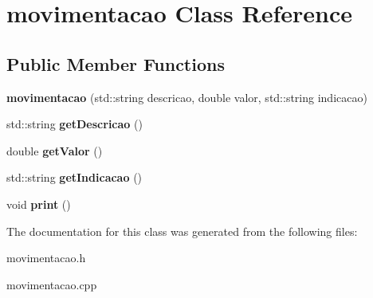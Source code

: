 \hypertarget{classmovimentacao}{}\section{movimentacao Class Reference}
\label{classmovimentacao}
\subsection*{Public Member Functions}
\begin{DoxyCompactItemize}
\item 
\mbox{\label{classmovimentacao_a2040c4f41fcf8679566dfa320883c33d}} 
{\bfseries movimentacao} (std\+::string descricao, double valor, std\+::string indicacao)
\item 
\mbox{\label{classmovimentacao_ad61189a54a8eee2bcfdfd615e43ff1b5}} 
std\+::string {\bfseries get\+Descricao} ()
\item 
\mbox{\label{classmovimentacao_a822eca4e214df599f64f9b1e47416d94}} 
double {\bfseries get\+Valor} ()
\item 
\mbox{\label{classmovimentacao_ad0b41f4116a95285335fb1af79621556}} 
std\+::string {\bfseries get\+Indicacao} ()
\item 
\mbox{\label{classmovimentacao_a1df2e8bc9f988a0f67825161c9c30fd8}} 
void {\bfseries print} ()
\end{DoxyCompactItemize}


The documentation for this class was generated from the following files\+:\begin{DoxyCompactItemize}
\item 
movimentacao.\+h\item 
movimentacao.\+cpp\end{DoxyCompactItemize}

